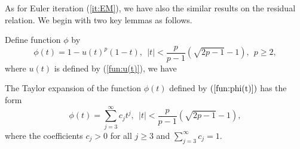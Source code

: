 As for Euler iteration (\ref{it:EM}), we have also the similar
results on the residual relation. We begin with two key lemmas as
follows.



Define function $\phi$ by
\begin{equation}
\label{fun:phi(t)} \phi(t) = 1 - u(t)^p(1 - t), \ \ |t| < \frac{p}{p
- 1}(\sqrt{2p - 1} - 1),\ \ p \geq 2,
\end{equation}
where $u(t)$ is defined by (\ref{fun:u(t)}), we have




\begin{lemma}
\label{lem:RatFunTayExp} The Taylor expansion of the function
$\phi(t)$ defined by $(\ref{fun:phi(t)})$ has the form
\begin{equation}
\label{eq:phi(t)_series_form} \phi(t) = \sum_{j = 3}^\infty c_j t^j,
\ \ |t| < \frac{p}{p - 1}(\sqrt{2p - 1} - 1),
\end{equation}
where the coefficients $c_j > 0$ for all $j \geq 3$ and $\sum_{j =
3}^\infty c_j = 1$.
\end{lemma}
